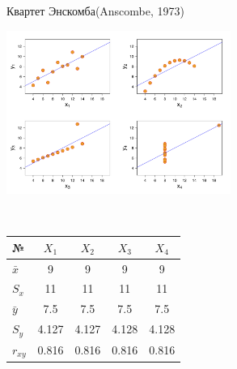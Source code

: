 \documentclass[11pt,pdf,utf8,hyperref={unicode},aspectratio=169]{beamer}
\begin{document}
\begin{frame}{Квартет Энскомба}{(Anscombe, 1973)}

    \begin{multicols}{2}
    \begin{center}
        \includegraphics[width=0.55\textwidth]{Anscombe's_quartet.png}
    \end{center}
    \columnbreak
    ~

    \vspace{1cm}

		\begin{center}
            \small
			\begin{tabular}{|l|cccc|}
				\hline
				№ & $X_1$    & $X_2$    & $X_3$    & $X_4$ \\ \hline
				$\bar{x}$ & 9    & 9    & 9    & 9    \\ \hline
				$S_x$   & 11   & 11   & 11   & 11   \\ \hline
				$\bar{y}$ & 7.5  & 7.5  & 7.5  & 7.5  \\ \hline
				$S_y$    & 4.127& 4.127& 4.128& 4.128\\ \hline
				$r_{xy}$  & 0.816& 0.816& 0.816& 0.816\\ \hline
			\end{tabular}
		\end{center}
    \end{multicols}
\end{frame}
\end{document}
